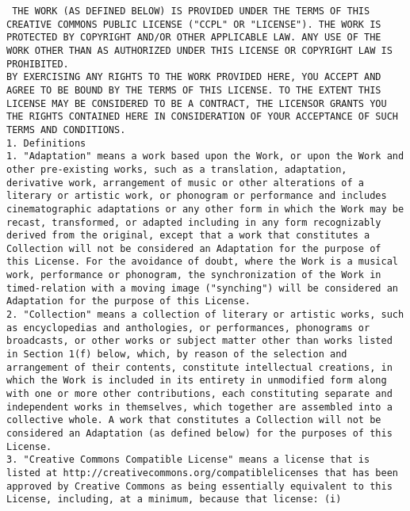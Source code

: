 {\tiny\tt\noindent
THE WORK (AS DEFINED BELOW) IS PROVIDED UNDER THE TERMS OF THIS
CREATIVE COMMONS PUBLIC LICENSE ("CCPL" OR "LICENSE"). THE WORK IS
PROTECTED BY COPYRIGHT AND/OR OTHER APPLICABLE LAW. ANY USE OF THE
WORK OTHER THAN AS AUTHORIZED UNDER THIS LICENSE OR COPYRIGHT LAW IS
PROHIBITED.
\\[4pt]
BY EXERCISING ANY RIGHTS TO THE WORK PROVIDED HERE, YOU ACCEPT AND
AGREE TO BE BOUND BY THE TERMS OF THIS LICENSE. TO THE EXTENT THIS
LICENSE MAY BE CONSIDERED TO BE A CONTRACT, THE LICENSOR GRANTS YOU
THE RIGHTS CONTAINED HERE IN CONSIDERATION OF YOUR ACCEPTANCE OF SUCH
TERMS AND CONDITIONS.
\\[4pt]
1. Definitions
\\[4pt]
   1. "Adaptation" means a work based upon the Work, or upon the Work
   and other pre-existing works, such as a translation, adaptation,
   derivative work, arrangement of music or other alterations of a
   literary or artistic work, or phonogram or performance and includes
   cinematographic adaptations or any other form in which the Work may
   be recast, transformed, or adapted including in any form
   recognizably derived from the original, except that a work that
   constitutes a Collection will not be considered an Adaptation for
   the purpose of this License. For the avoidance of doubt, where the
   Work is a musical work, performance or phonogram, the
   synchronization of the Work in timed-relation with a moving image
   ("synching") will be considered an Adaptation for the purpose of
   this License.
\\[4pt]
   2. "Collection" means a collection of literary or artistic works,
   such as encyclopedias and anthologies, or performances, phonograms
   or broadcasts, or other works or subject matter other than works
   listed in Section 1(f) below, which, by reason of the selection and
   arrangement of their contents, constitute intellectual creations,
   in which the Work is included in its entirety in unmodified form
   along with one or more other contributions, each constituting
   separate and independent works in themselves, which together are
   assembled into a collective whole. A work that constitutes a
   Collection will not be considered an Adaptation (as defined below)
   for the purposes of this License.
\\[4pt]
   3. "Creative Commons Compatible License" means a license that is
   listed at http://creativecommons.org/compatiblelicenses that has
   been approved by Creative Commons as being essentially equivalent
   to this License, including, at a minimum, because that license: (i)
}
